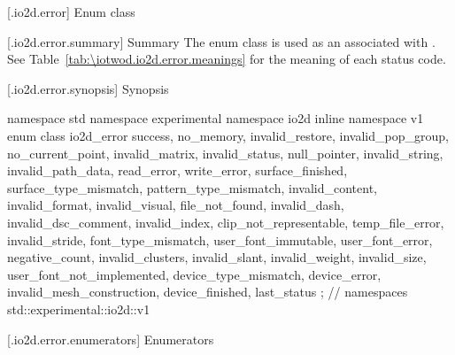  [\iotwod.io2d.error] {Enum class }

 [\iotwod.io2d.error.summary] { Summary}
\pnum
The  enum class is used as an  
associated with . See 
Table~\ref{tab:\iotwod.io2d.error.meanings} for the meaning of each
status code.

 [\iotwod.io2d.error.synopsis] { Synopsis}

%
\begin{codeblock}
namespace std { namespace experimental { namespace io2d { inline namespace v1 {
  enum class io2d_error {
    success,
    no_memory,
    invalid_restore,
    invalid_pop_group,
    no_current_point,
    invalid_matrix,
    invalid_status,
    null_pointer,
    invalid_string,
    invalid_path_data,
    read_error,
    write_error,
    surface_finished,
    surface_type_mismatch,
    pattern_type_mismatch,
    invalid_content,
    invalid_format,
    invalid_visual,
    file_not_found,
    invalid_dash,
    invalid_dsc_comment,
    invalid_index,
    clip_not_representable,
    temp_file_error,
    invalid_stride,
    font_type_mismatch,
    user_font_immutable,
    user_font_error,
    negative_count,
    invalid_clusters,
    invalid_slant,
    invalid_weight,
    invalid_size,
    user_font_not_implemented,
    device_type_mismatch,
    device_error,
    invalid_mesh_construction,
    device_finished,
    last_status
  };
} } } } // namespaces std::experimental::io2d::v1
\end{codeblock}

 [\iotwod.io2d.error.enumerators] { Enumerators}

